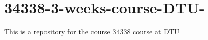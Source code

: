 \chapter{34338-\/3-\/weeks-\/course-\/\+DTU-\/}
\hypertarget{md__r_e_a_d_m_e}{}\label{md__r_e_a_d_m_e}
\label{md__r_e_a_d_m_e_autotoc_md0}%
%


This is a repository for the course 34338 course at DTU 
